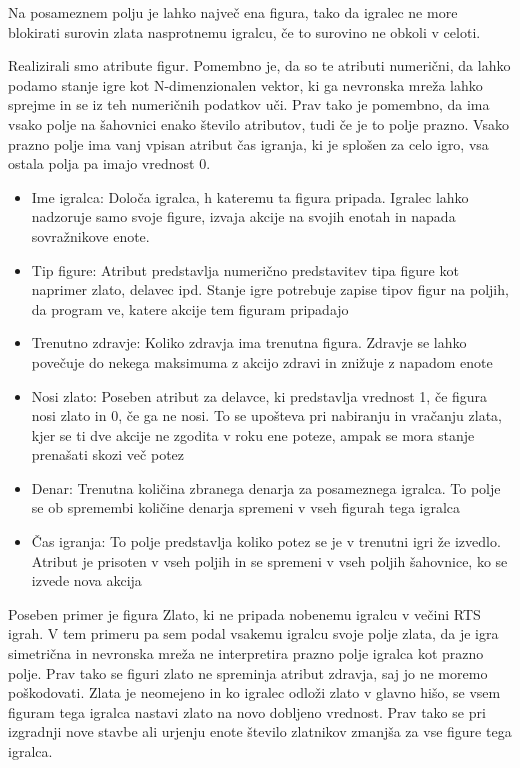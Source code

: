 \documentclass[a4paper, 12pt]{book}
\begin{document}
Na posameznem polju je lahko največ ena figura, tako da igralec ne more blokirati surovin zlata nasprotnemu igralcu, če to surovino ne obkoli v celoti.

Realizirali smo atribute figur. Pomembno je, da so te atributi numerični, da lahko podamo stanje igre kot N-dimenzionalen vektor, ki ga nevronska mreža lahko sprejme in se iz teh numeričnih podatkov uči.
Prav tako je pomembno, da ima vsako polje na šahovnici enako število atributov, tudi če je to polje prazno.
Vsako prazno polje ima vanj vpisan atribut čas igranja, ki je splošen za celo igro, vsa ostala polja pa imajo vrednost 0.
\begin{itemize}
	\item Ime igralca: Določa igralca, h kateremu ta figura pripada. Igralec lahko nadzoruje samo svoje figure, izvaja akcije na svojih enotah in napada sovražnikove enote.
	\item Tip figure: Atribut predstavlja numerično predstavitev tipa figure kot naprimer zlato, delavec ipd. Stanje igre potrebuje zapise tipov figur na poljih, da program ve, katere akcije tem figuram pripadajo
	\item Trenutno zdravje: Koliko zdravja ima trenutna figura. Zdravje se lahko povečuje do nekega maksimuma z akcijo zdravi in znižuje z napadom enote
	\item Nosi zlato: Poseben atribut za delavce, ki predstavlja vrednost 1, če figura nosi zlato in 0, če ga ne nosi. To se upošteva pri nabiranju in vračanju zlata, kjer se ti dve akcije ne zgodita v roku ene poteze, ampak se mora stanje prenašati skozi več potez
	\item Denar: Trenutna količina zbranega denarja za posameznega igralca. To polje se ob spremembi količine denarja spremeni v vseh figurah tega igralca
	\item Čas igranja: To polje predstavlja koliko potez se je v trenutni igri že izvedlo. Atribut je prisoten v vseh poljih in se spremeni v vseh poljih šahovnice, ko se izvede nova akcija
\end{itemize}
Poseben primer je figura Zlato, ki ne pripada nobenemu igralcu v večini RTS igrah. 
V tem primeru pa sem podal vsakemu igralcu svoje polje zlata, da je igra simetrična in nevronska mreža ne interpretira prazno polje igralca kot prazno polje.
Prav tako se figuri zlato ne spreminja atribut zdravja, saj jo ne moremo poškodovati. 
Zlata je neomejeno in ko igralec odloži zlato v glavno hišo, se vsem figuram tega igralca nastavi zlato na novo dobljeno vrednost. 
Prav tako se pri izgradnji nove stavbe ali urjenju enote število zlatnikov zmanjša za vse figure tega igralca.
\end{document}
